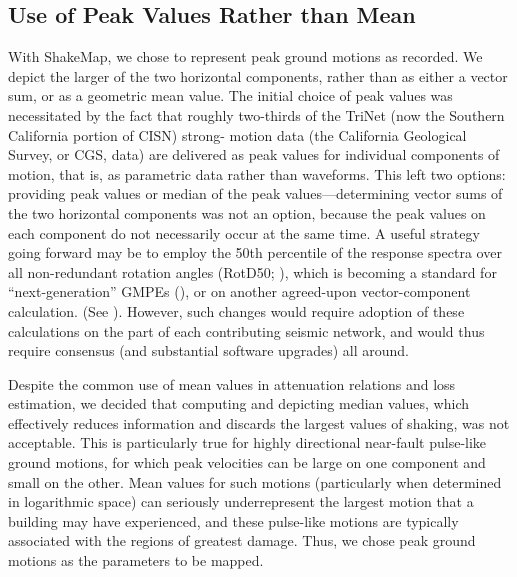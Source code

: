 \documentclass[letterpaper,10pt,english]{sphinxmanual}
\begin{document}
\subsection{Use of Peak Values Rather than Mean}
\label{tg_choice_of_parameters:peak-values-vs-mean}\label{tg_choice_of_parameters:use-of-peak-values-rather-than-mean}
With ShakeMap, we chose to represent peak ground motions as recorded. We depict the
larger of the two horizontal components, rather than as either a vector sum, or as a
geometric mean value. The initial choice of peak values was necessitated by the fact that
roughly two-thirds of the TriNet (now the Southern California portion of CISN) strong-
motion data (the California Geological Survey, or CGS, data)
are delivered as peak values for individual components of
motion, that is, as parametric data rather than waveforms. This left two options: providing peak
values or median of the peak values---determining vector sums of the two horizontal
components was not an option, because the peak values on each component do not
necessarily occur at the same time.  A useful strategy going forward may be to employ
the 50th percentile of the response spectra over all non-redundant rotation angles
(RotD50; {\hyperref[references:boore2010]{}}), which is becoming a standard
for ``next-generation''
GMPEs ({\hyperref[references:abrahamson2014]{}}), or on another
agreed-upon vector-component
calculation. (See {\hyperref[future_directions:future\string-directions]{}}). However, such changes would
require adoption of these
calculations on the part of each contributing seismic network, and would thus require
consensus (and substantial software upgrades) all around.

Despite the common use of mean values in attenuation relations and loss estimation, we
decided that computing and depicting median values, which effectively reduces
information and discards the largest values of shaking, was not acceptable. This is
particularly true for highly directional near-fault pulse-like ground motions, for which
peak velocities can be large on one component and small on the other.  Mean values for
such motions (particularly when determined in logarithmic space) can seriously underrepresent
the largest motion that a building may have experienced, and these pulse-like motions are
typically associated with the regions of greatest damage. Thus, we chose peak ground
motions as the parameters to be mapped.
\end{document}
